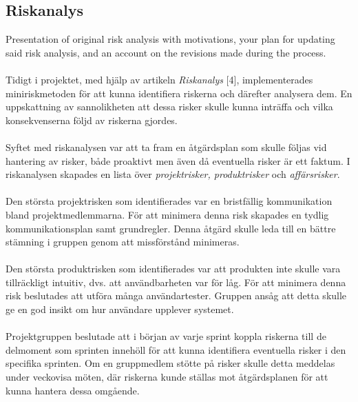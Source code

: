 \documentclass[12pt]{article}
\begin{document}
\subsection{Riskanalys}
Presentation of original risk analysis with motivations, your plan for updating said risk analysis, and an account on the revisions made during the process. \\\\
 Tidigt i projektet, med hjälp av artikeln \textit{Riskanalys} [4], implementerades miniriskmetoden för att kunna identifiera riskerna och därefter analysera dem. En uppskattning av sannolikheten att dessa risker skulle kunna inträffa och vilka konsekvenserna följd av riskerna gjordes.\\\\
 Syftet med riskanalysen var att ta fram en åtgärdsplan som skulle följas vid hantering av risker, både proaktivt men även då eventuella risker är ett faktum. I riskanalysen skapades en lista över \textit{projektrisker, produktrisker} och \textit{affärsrisker}.\\\\
 Den största projektrisken som identifierades var en bristfällig kommunikation bland projektmedlemmarna. För att minimera denna risk skapades en tydlig kommunikationsplan samt grundregler. Denna åtgärd skulle leda till en bättre stämning i gruppen genom att missförstånd minimeras.\\\\
 Den största produktrisken som identifierades var att produkten inte skulle vara tillräckligt intuitiv, dvs. att användbarheten var för låg. För att minimera denna risk beslutades att utföra många användartester. Gruppen ansåg att detta skulle ge en god insikt om hur användare upplever systemet.\\\\
 Projektgruppen beslutade att i början av varje sprint koppla riskerna till de delmoment som sprinten innehöll för att kunna identifiera eventuella risker i den specifika sprinten. Om en gruppmedlem stötte på risker skulle detta meddelas under veckovisa möten, där riskerna kunde ställas mot åtgärdsplanen för att kunna hantera dessa omgående.\\\\
 
\end{document}
